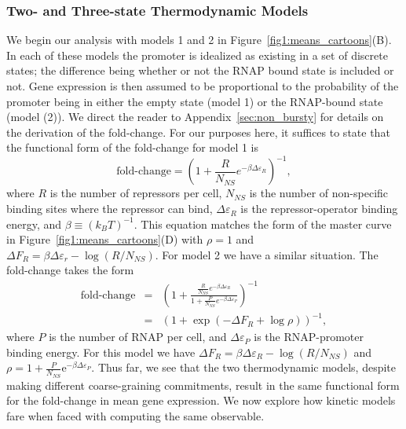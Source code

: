 \subsubsection{Two- and Three-state Thermodynamic Models}
We begin our analysis with models 1 and 2 in
Figure~\ref{fig1:means_cartoons}(B). In each of these models the promoter
is idealized as existing in a set of discrete states; the difference being
whether or not the RNAP bound state is included or not. Gene expression is then
assumed to be proportional to the probability of the promoter being in either
the empty state (model 1) or the RNAP-bound state (model (2)). We direct the
reader to Appendix~\ref{sec:non_bursty} for details on the derivation of the
fold-change. For our purposes here, it suffices to state that the functional
form of the fold-change for model 1 is
\begin{equation}
\text{fold-change}
= \left(1 + \frac{R}{N_{NS}} e^{-\beta\Delta\varepsilon_R}\right)^{-1},
\end{equation}
where $R$ is the number of repressors per cell, $N_{NS}$ is the number of
non-specific binding sites where the repressor can bind, $\Delta\varepsilon_R$
is the repressor-operator binding energy, and $\beta \equiv (k_BT)^{-1}$. This
equation matches the form of the master curve in
Figure~\ref{fig1:means_cartoons}(D) with $\rho=1$ and $\Delta F_R =
\beta\Delta\varepsilon_r - \log (R / N_{NS})$. For model 2 we have a similar
situation. The fold-change takes the form
\begin{eqnarray}
\text{fold-change}
&=& \left(
1 + \frac{\frac{R}{N_{NS}} e^{-\beta\Delta\varepsilon_R}}
        {1 + \frac{P}{N_{NS}} e^{-\beta\Delta\varepsilon_P}}
\right)^{-1}
\\
&=& (1 + \exp(-\Delta F_R + \log\rho))^{-1},
\end{eqnarray}
where $P$ is the number of RNAP per cell, and $\Delta\varepsilon_P$ is the
RNAP-promoter binding energy. For this model we have $\Delta F_R =
\beta\Delta\varepsilon_R - \log(R/N_{NS})$ and $\rho = 1 +
\frac{P}{N_{NS}}\mathrm{e}^{-\beta\Delta\varepsilon_P}$. Thus far, we see that
the two thermodynamic models, despite making different coarse-graining
commitments, result in the same functional form for the fold-change in mean gene
expression.  We now explore how kinetic models fare when faced with computing
the same observable.


